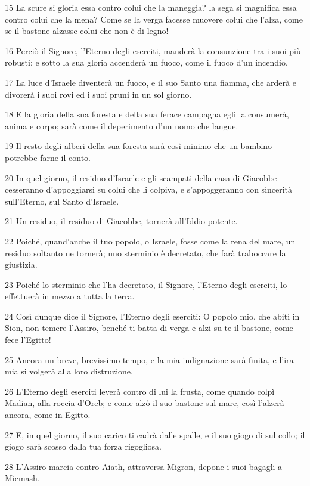 \par 15 La scure si gloria essa contro colui che la maneggia? la sega si magnifica essa contro colui che la mena? Come se la verga facesse muovere colui che l'alza, come se il bastone alzasse colui che non è di legno!
\par 16 Perciò il Signore, l'Eterno degli eserciti, manderà la consunzione tra i suoi più robusti; e sotto la sua gloria accenderà un fuoco, come il fuoco d'un incendio.
\par 17 La luce d'Israele diventerà un fuoco, e il suo Santo una fiamma, che arderà e divorerà i suoi rovi ed i suoi pruni in un sol giorno.
\par 18 E la gloria della sua foresta e della sua ferace campagna egli la consumerà, anima e corpo; sarà come il deperimento d'un uomo che langue.
\par 19 Il resto degli alberi della sua foresta sarà così minimo che un bambino potrebbe farne il conto.
\par 20 In quel giorno, il residuo d'Israele e gli scampati della casa di Giacobbe cesseranno d'appoggiarsi su colui che li colpiva, e s'appoggeranno con sincerità sull'Eterno, sul Santo d'Israele.
\par 21 Un residuo, il residuo di Giacobbe, tornerà all'Iddio potente.
\par 22 Poiché, quand'anche il tuo popolo, o Israele, fosse come la rena del mare, un residuo soltanto ne tornerà; uno sterminio è decretato, che farà traboccare la giustizia.
\par 23 Poiché lo sterminio che l'ha decretato, il Signore, l'Eterno degli eserciti, lo effettuerà in mezzo a tutta la terra.
\par 24 Così dunque dice il Signore, l'Eterno degli eserciti: O popolo mio, che abiti in Sion, non temere l'Assiro, benché ti batta di verga e alzi su te il bastone, come fece l'Egitto!
\par 25 Ancora un breve, brevissimo tempo, e la mia indignazione sarà finita, e l'ira mia si volgerà alla loro distruzione.
\par 26 L'Eterno degli eserciti leverà contro di lui la frusta, come quando colpì Madian, alla roccia d'Oreb; e come alzò il suo bastone sul mare, così l'alzerà ancora, come in Egitto.
\par 27 E, in quel giorno, il suo carico ti cadrà dalle spalle, e il suo giogo di sul collo; il giogo sarà scosso dalla tua forza rigogliosa.
\par 28 L'Assiro marcia contro Aiath, attraversa Migron, depone i suoi bagagli a Micmash.
